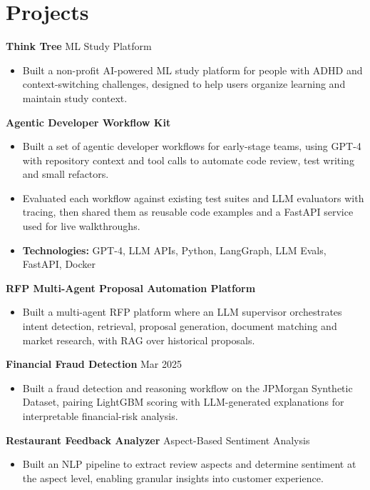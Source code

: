 \documentclass[10pt,a4paper]{article}
\begin{document}
\section{Projects}
\textbf{Think Tree} \textbar{} ML Study Platform\par
\begin{itemize}
  \item Built a non-profit AI-powered ML study platform for people with ADHD and context-switching challenges, designed to help users organize learning and maintain study context.
\end{itemize}
\textbf{Agentic Developer Workflow Kit}\par
\begin{itemize}
  \item Built a set of agentic developer workflows for early-stage teams, using GPT-4 with repository context and tool calls to automate code review, test writing and small refactors.
  \item Evaluated each workflow against existing test suites and LLM evaluators with tracing, then shared them as reusable code examples and a FastAPI service used for live walkthroughs.
  \item \textbf{Technologies:} GPT-4, LLM APIs, Python, LangGraph, LLM Evals, FastAPI, Docker
\end{itemize}
\textbf{RFP Multi-Agent Proposal Automation Platform}\par
\begin{itemize}
  \item Built a multi-agent RFP platform where an LLM supervisor orchestrates intent detection, retrieval, proposal generation, document matching and market research, with RAG over historical proposals.
\end{itemize}
\textbf{Financial Fraud Detection} \textbar{} Mar 2025\par
\begin{itemize}
  \item Built a fraud detection and reasoning workflow on the JPMorgan Synthetic Dataset, pairing LightGBM scoring with LLM-generated explanations for interpretable financial-risk analysis.
\end{itemize}
\textbf{Restaurant Feedback Analyzer} \textbar{} Aspect-Based Sentiment Analysis\par
\begin{itemize}
  \item Built an NLP pipeline to extract review aspects and determine sentiment at the aspect level, enabling granular insights into customer experience.
\end{itemize}
\end{document}
